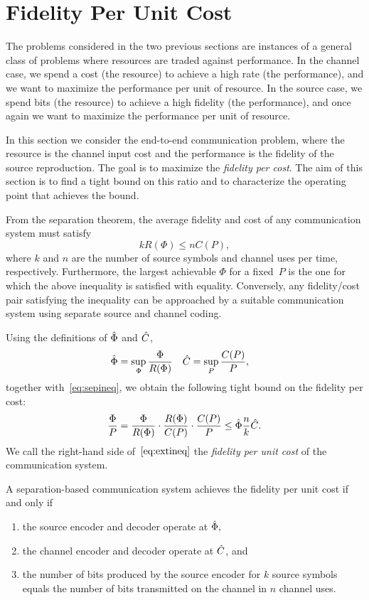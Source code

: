 \section{Fidelity Per Unit Cost}
\label{sec:fidcostbound}

The problems considered in the two previous sections are instances of a general
class of problems where resources are traded against performance.  In the
channel case, we spend a cost (the resource) to achieve a high rate
(the performance), and we want to maximize the
performance per unit of resource. In the source case, we spend bits (the
resource) to achieve a high fidelity (the performance), and once again we want
to maximize the performance per unit of resource.  

In this section we consider the end-to-end communication problem, where the
resource is the channel input cost and the performance is the fidelity of the
source reproduction. The goal is to maximize the \emph{fidelity per cost}. The
aim of this section is to find a tight bound on this ratio and  to characterize
the operating point that achieves the bound.

From the separation theorem, the average fidelity and cost of any communication
system must satisfy
\begin{equation}
  \label{eq:sepineq}
  k R(\Phi) \le n C(P),
\end{equation}
where $k$ and $n$ are the number of source symbols and channel uses per time,
respectively. Furthermore, the largest achievable $\Phi$ for a fixed~$P$ is the
one for which the above inequality is satisfied with equality.
Conversely, any fidelity/cost pair satisfying the inequality can
be approached by a suitable communication system using separate source and
channel coding.

Using the definitions of ${\hat{\Phi}}$ and ${\hat{C}}$,
\begin{align*}
  {\hat{\Phi}} &= \sup_\Phi \frac{\Phi}{R(\Phi)} & {\hat{C}} &= \sup_P \frac{C(P)}{P},
\end{align*}
together with~\eqref{eq:sepineq}, we obtain the following tight bound on the
fidelity per cost:
\begin{equation}
  \label{eq:extineq}
\frac\Phi P = \frac\Phi{R(\Phi)} \cdot \frac{R(\Phi)}{C(P)} \cdot
\frac{C(P)}{P} \le {\hat{\Phi}} \frac nk {\hat{C}}.
\end{equation}
We call the right-hand side of~$\eqref{eq:extineq}$ the \emph{fidelity per unit
cost} of the communication system.

A separation-based communication system achieves the fidelity per unit cost if
and only if 
\begin{enumerate}
\item the source encoder and decoder operate at ${\hat{\Phi}},$
\item the channel encoder and decoder operate at ${\hat{C}}$, and
\item the number of bits produced by the source encoder for $k$ source symbols
  equals the number of bits transmitted on the channel in $n$ channel uses. 
\end{enumerate}


